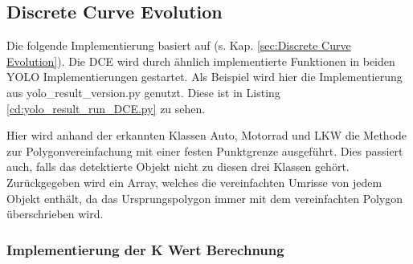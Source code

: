 \subsection{Discrete Curve Evolution}{
	\label{py:DCE}
	Die folgende Implementierung basiert auf \citeauthor{Barkowsky2000} \citep{Barkowsky2000} (s. Kap. \ref{sec:Discrete Curve Evolution}). Die DCE wird durch ähnlich implementierte Funktionen in beiden YOLO Implementierungen gestartet. Als Beispiel wird hier die Implementierung aus yolo\_result\_version.py genutzt. \ifimportant Diese ist in Listing \ref{cd:yolo_result_run_DCE.py} zu sehen. \fi \\
	\ifimportant
	
	\fi Hier wird anhand der erkannten Klassen Auto, Motorrad und LKW die Methode zur Polygonvereinfachung mit einer festen Punktgrenze ausgeführt. Dies passiert auch, falls das detektierte Objekt nicht zu diesen drei Klassen gehört. \\ 
	Zurückgegeben wird ein Array, welches die vereinfachten Umrisse von jedem Objekt enthält, da das Ursprungspolygon immer mit dem vereinfachten Polygon überschrieben wird. \\

	\subsubsection{Implementierung der K Wert Berechnung \label{impl:Calc_K_Val}} 

}
